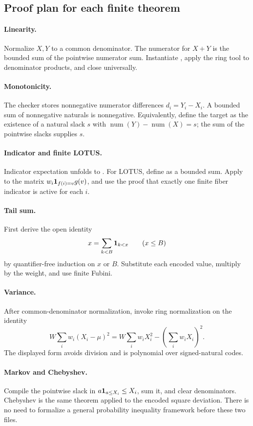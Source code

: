 \subsection{Proof plan for each finite theorem}

\paragraph{Linearity.}
Normalize \(X,Y\) to a common denominator.  The numerator for \(X+Y\) is the
bounded sum of the pointwise numerator sum.  Instantiate , apply
the ring tool to denominator products, and close universally.

\paragraph{Monotonicity.}
The checker stores nonnegative numerator differences
\(d_i=Y_i-X_i\).  A bounded sum of nonnegative naturals is nonnegative.
Equivalently, define the target as the existence of a natural slack
\(s\) with \(\operatorname{num}(Y)-\operatorname{num}(X)=s\); the sum of the
pointwise slacks supplies \(s\).

\paragraph{Indicator and finite LOTUS.}
Indicator expectation unfolds to .  For LOTUS, define
 as a bounded sum.  Apply  to the matrix
\(w_i\mathbf 1_{f(i)=v}g(v)\), and use the proof that exactly one finite fiber
indicator is active for each \(i\).

\paragraph{Tail sum.}
First derive the open identity
\[
 x=\sum_{k<B}\mathbf 1_{k<x}\qquad(x\le B)
\]
by quantifier-free induction on \(x\) or \(B\).  Substitute each encoded value,
multiply by the weight, and use finite Fubini.

\paragraph{Variance.}
After common-denominator normalization, invoke ring normalization on the
identity
\[
 W\sum_iw_i(X_i-\mu)^2
 =W\sum_iw_iX_i^2-(\sum_iw_iX_i)^2.
\]
The displayed form avoids division and is polynomial over signed-natural
codes.

\paragraph{Markov and Chebyshev.}
Compile the pointwise slack in
\(a\mathbf 1_{a\le X_i}\le X_i\), sum it, and clear denominators.  Chebyshev is the
same theorem applied to the encoded square deviation.  There is no need to
formalize a general probability inequality framework before these two files.

